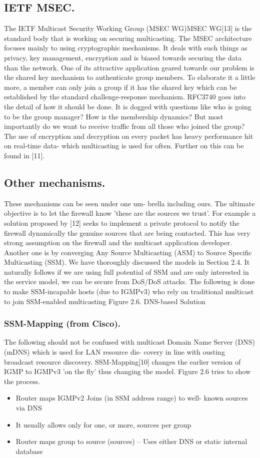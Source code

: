 \documentclass[11pt,left=2cm,bottom=2cm,oneside]{book}
\begin{document}
\subsection{IETF MSEC.} The IETF Multicast Security Working Group (MSEC
WG)MSEC WG[13] is the standard body that is working on securing multicasting.
The MSEC architecture focuses mainly to using cryptographic mechanisms. It
deals
with such things as privacy, key management, encryption and is biased towards
securing the data than the network. One of its attractive application geared
towards
our problem is the shared key mechanism to authenticate group members. To
elaborate it a little more, a member can only join a group if it has the
shared key
which can be established by the standard challenge-response mechanism. RFC3740
goes into the detail of how it should be done. It is dogged with questions
like who
is going to be the group manager? How is the membership dynamics? But most
importantly do we want to receive traffic from all those who joined the group?
The use of encryption and decryption on every packet has heavy performance
hit on real-time data- which multicasting is used for often. Further on this
can be
found in [11].
\subsection{Other mechanisms.} These mechanisms can be seen under one um-
brella including ours. The ultimate objective is to let the firewall know
'these are
the sources we trust'. For example a solution proposed by [12] seeks to
implement
a private protocol to notify the firewall dynamically the genuine sources that
are
being contacted. This has very strong assumption on the firewall and the
multicast
application developer.
Another one is by converging Any Source Multicasting (ASM) to Source Specific
Multicasting (SSM). We have thoroughly discussed the models in Section 2.4. It
naturally follows if we are using full potential of SSM and are only
interested in the
service model, we can be secure from DoS/DoS attacks. The following is done to
make SSM-incapable hosts (due to IGMPv3) who rely on traditional multicast to
join SSM-enabled multicasting
Figure 2.6. DNS-based Solution
\subsubsection{SSM-Mapping (from Cisco).} The following should not be confused with
multicast Domain Name Server (DNS) (mDNS) which is used for LAN resource dis-
covery in line with ousting broadcast resource discovery. SSM-Mapping[10]
changes
the earlier version of IGMP to IGMPv3 'on the fly' thus changing the model.
Figure
2.6 tries to show the process.
\begin{itemize}
\item Router maps IGMPv2 Joins (in SSM address range) to well- known sources
via DNS
\item It usually allows only for one, or more, sources per group
\item Router maps group to source (sources) – Uses either DNS or static internal
database
\end{itemize}
\end{document}
